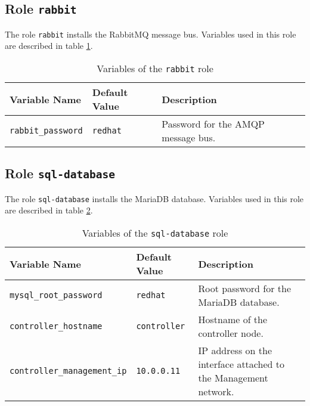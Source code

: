 \subsection{Role \texttt{rabbit}}

The role \texttt{rabbit} installs the RabbitMQ message bus. Variables used in this role are described in table \ref{table-rabbit}.

\begin{table}[!h]
  \centering
  \begin{tabular}{|l|l|p{5cm}|}\hline
    Variable Name & Default Value & Description \\\hline
    \texttt{rabbit\_password} & \texttt{redhat} & Password for the AMQP message bus. \\\hline
  \end{tabular}
\caption{Variables of the \texttt{rabbit} role}
\label{table-rabbit}
\end{table}


\subsection{Role \texttt{sql-database}}

The role \texttt{sql-database} installs the MariaDB database. Variables used in this role are described in table \ref{table-sql-database}.

\begin{table}[!h]
  \centering
  \begin{tabular}{|l|l|p{5cm}|}\hline
    Variable Name & Default Value & Description \\\hline
    \texttt{mysql\_root\_password} & \texttt{redhat} & Root password for the MariaDB database. \\\hline
    \texttt{controller\_hostname} & \texttt{controller} & Hostname of the controller node. \\\hline
    \texttt{controller\_management\_ip} & \texttt{10.0.0.11} & IP address on the interface attached to the Management network. \\\hline

  \end{tabular}
\caption{Variables of the \texttt{sql-database} role}
\label{table-sql-database}
\end{table}





